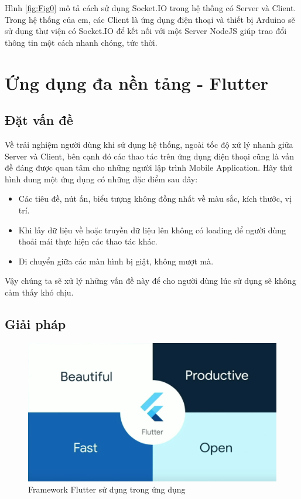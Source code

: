 \documentclass[../DoAn.tex]{subfiles}
\begin{document}
Hình \ref{fig:Fig0} mô tả cách sử dụng Socket.IO trong hệ thống có Server và Client. Trong hệ thống của em, các Client là ứng dụng điện thoại và thiết bị Arduino sẽ sử dụng thư viện có Socket.IO để kết nối với một Server NodeJS giúp trao đổi thông tin một cách nhanh chóng, tức thời.

\section{Ứng dụng đa nền tảng - Flutter}
\subsection{Đặt vấn đề}

Về trải nghiệm người dùng khi sử dụng hệ thống, ngoài tốc độ xử lý nhanh giữa Server và Client, bên cạnh đó các thao tác trên ứng dụng điện thoại cũng là vấn đề đáng được quan tâm cho những người lập trình Mobile Application. Hãy thử hình dung một ứng dụng có những đặc điểm sau đây:

\begin{itemize}
    \item Các tiêu đề, nút ấn, biểu tượng không đồng nhất về màu sắc, kích thước, vị trí.
    \item Khi lấy dữ liệu về hoặc truyền dữ liệu lên không có loading để người dùng thoải mái thực hiện các thao tác khác.
    \item Di chuyển giữa các màn hình bị giật, không mượt mà.
\end{itemize}

Vậy chúng ta sẽ xử lý những vấn đề này để cho người dùng lúc sử dụng sẽ không cảm thấy khó chịu.

\subsection{Giải pháp}

\begin{figure}[H]
    \centering
    \includegraphics[scale = 0.3]{Hinhve/flutter.png}
    \caption{Framework Flutter sử dụng trong ứng dụng}
    \label{fig:Fig1}
\end{figure}
\end{document}
